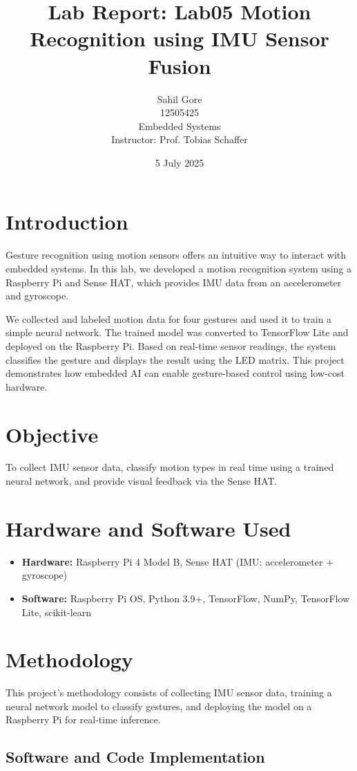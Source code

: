 \documentclass[a4paper,12pt]{article}
\title{Lab Report: \textbf{Lab05 Motion Recognition using IMU Sensor Fusion}}
\author{Sahil Gore \\ 12505425  \\ Embedded Systems \\ Instructor: Prof. Tobias Schaffer}
\date{5 July 2025}
\begin{document}
\maketitle

\section{Introduction}
Gesture recognition using motion sensors offers an intuitive way to interact with embedded systems. In this lab, we developed a motion recognition system using a Raspberry Pi and Sense HAT, which provides IMU data from an accelerometer and gyroscope.

We collected and labeled motion data for four gestures and used it to train a simple neural network. The trained model was converted to TensorFlow Lite and deployed on the Raspberry Pi. Based on real-time sensor readings, the system classifies the gesture and displays the result using the LED matrix. This project demonstrates how embedded AI can enable gesture-based control using low-cost hardware.

\section{Objective}
To collect IMU sensor data, classify motion types in real time using a trained neural network, and provide visual feedback via the Sense HAT.

\section{Hardware and Software Used}
\begin{itemize}
    \item \textbf{Hardware:} Raspberry Pi 4 Model B, Sense HAT (IMU: accelerometer + gyroscope)
    \item \textbf{Software:} Raspberry Pi OS, Python 3.9+, TensorFlow, NumPy, TensorFlow Lite, scikit-learn
\end{itemize}

\section{Methodology}
This project’s methodology consists of collecting IMU sensor data, training a neural network model to classify gestures, and deploying the model on a Raspberry Pi for real-time inference. 

\subsection*{Software and Code Implementation}
\end{document}
